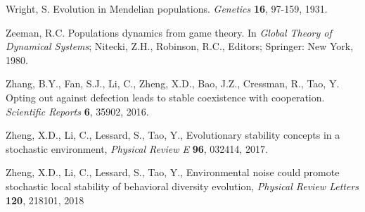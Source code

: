 \documentclass[11pt]{article}
\begin{document}
\begin{thebibliography}{99}
Wright, S. Evolution in Mendelian populations. {\it Genetics } {\bf 16}, 97-159, 1931.



Zeeman, R.C. Populations dynamics from game theory. In {\em Global Theory of Dynamical Systems}; Nitecki, Z.H., Robinson, R.C., Editors; Springer: New York, 1980.

Zhang, B.Y., Fan, S.J., Li, C., Zheng, X.D.,  Bao, J.Z.,
Cressman, R.,  Tao, Y. Opting out against defection leads to
stable coexistence with cooperation. {\it Scientific Reports} {\bf
6}, 35902, 2016.

Zheng, X.D., Li, C., Lessard, S., Tao, Y., Evolutionary stability concepts in a stochastic environment, {\em Physical Review E} {\bf 96}, 032414, 2017.

Zheng, X.D., Li, C., Lessard, S., Tao, Y., Environmental noise could promote stochastic local stability of behavioral diversity evolution, {\em Physical Review Letters} {\bf 120}, 218101, 2018








\end{thebibliography}
\end{document}
